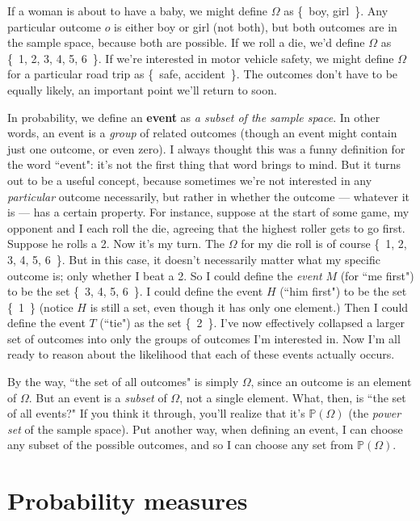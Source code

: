 If a woman is about to have a baby, we might define $\Omega$ as \{~boy,
girl~\}. Any particular outcome $o$ is either boy or girl (not both),
but both outcomes are in the sample space, because both are possible. If we
roll a die, we'd define $\Omega$ as \{~1, 2, 3, 4, 5, 6~\}. If we're
interested in motor vehicle safety, we might define $\Omega$ for a
particular road trip as \{~safe, accident~\}. The outcomes don't have to be
equally likely, an important point we'll return to soon.

In probability, we define an \textbf{event} as \textit{a subset of the
sample space}. In other words, an event is a \textit{group} of related
outcomes (though an event might contain just one outcome, or even zero). I
always thought this was a funny definition for the word ``event": it's not
the first thing that word brings to mind. But it turns out to be a useful
concept, because sometimes we're not interested in any \textit{particular}
outcome necessarily, but rather in whether the outcome --- whatever it is
--- has a certain property. For instance, suppose at the start of some
game, my opponent and I each roll the die, agreeing that the highest roller
gets to go first. Suppose he rolls a 2. Now it's my turn. The $\Omega$ for
my die roll is of course \{~1, 2, 3, 4, 5, 6~\}. But in this case, it
doesn't necessarily matter what my specific outcome is; only whether I beat
a 2. So I could define the \textit{event} $M$ (for ``me first") to be the
set \{~3, 4, 5, 6~\}. I could define the event $H$ (``him first") to be the
set \{~1~\} (notice $H$ is still a set, even though it has only one
element.) Then I could define the event $T$ (``tie") as the set \{~2~\}.
I've now effectively collapsed a larger set of outcomes into only the
groups of outcomes I'm interested in. Now I'm all ready to reason about the
likelihood that each of these events actually occurs.

By the way, ``the set of all outcomes" is simply $\Omega$, since an outcome
is an element of $\Omega$. But an event is a \textit{subset} of $\Omega$,
not a single element. What, then, is ``the set of all events?" If you think
it through, you'll realize that it's $\mathbb{P}(\Omega)$ (the
\textit{power set} of the sample space). Put another way, when defining an
event, I can choose any subset of the possible outcomes, and so I can
choose any set from $\mathbb{P}(\Omega)$.

\section{Probability measures}

